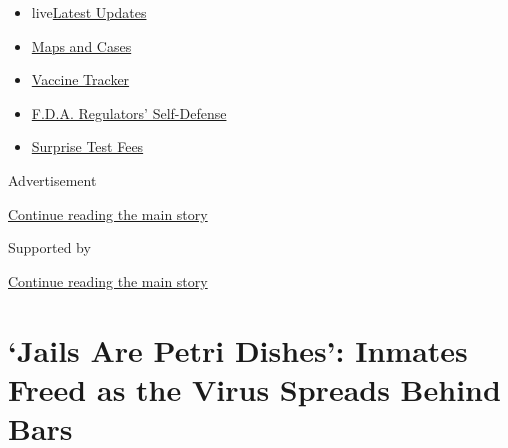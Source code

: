\begin{itemize}
\tightlist
\item
  live\href{https://www.nytimes3xbfgragh.onion/2020/09/11/world/covid-19-coronavirus.html?name=styln-coronavirus-national\&region=TOP_BANNER\&block=storyline_menu_recirc\&action=click\&pgtype=Article\&impression_id=5c0b5321-f4b7-11ea-8240-dbdc704b8894\&variant=undefined}{Latest
  Updates}
\item
  \href{https://www.nytimes3xbfgragh.onion/interactive/2020/us/coronavirus-us-cases.html?name=styln-coronavirus-national\&region=TOP_BANNER\&block=storyline_menu_recirc\&action=click\&pgtype=Article\&impression_id=5c0b5322-f4b7-11ea-8240-dbdc704b8894\&variant=undefined}{Maps
  and Cases}
\item
  \href{https://www.nytimes3xbfgragh.onion/interactive/2020/science/coronavirus-vaccine-tracker.html?name=styln-coronavirus-national\&region=TOP_BANNER\&block=storyline_menu_recirc\&action=click\&pgtype=Article\&impression_id=5c0b7a30-f4b7-11ea-8240-dbdc704b8894\&variant=undefined}{Vaccine
  Tracker}
\item
  \href{https://www.nytimes3xbfgragh.onion/2020/09/10/us/politics/fda-coronavirus-vaccine.html?name=styln-coronavirus-national\&region=TOP_BANNER\&block=storyline_menu_recirc\&action=click\&pgtype=Article\&impression_id=5c0b7a31-f4b7-11ea-8240-dbdc704b8894\&variant=undefined}{F.D.A.
  Regulators' Self-Defense}
\item
  \href{https://www.nytimes3xbfgragh.onion/2020/09/09/upshot/coronavirus-surprise-test-fees.html?name=styln-coronavirus-national\&region=TOP_BANNER\&block=storyline_menu_recirc\&action=click\&pgtype=Article\&impression_id=5c0b7a32-f4b7-11ea-8240-dbdc704b8894\&variant=undefined}{Surprise
  Test Fees}
\end{itemize}

Advertisement

\protect\hyperlink{after-top}{Continue reading the main story}

Supported by

\protect\hyperlink{after-sponsor}{Continue reading the main story}

\hypertarget{jails-are-petri-dishes-inmates-freed-as-the-virus-spreads-behind-bars}{%
\section{`Jails Are Petri Dishes': Inmates Freed as the Virus Spreads
Behind
Bars}\label{jails-are-petri-dishes-inmates-freed-as-the-virus-spreads-behind-bars}}

